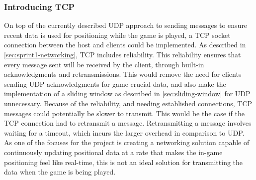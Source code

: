 \subsubsection{Introducing TCP}
On top of the currently described UDP approach to sending messages to ensure recent data is used for positioning while the game is played, a TCP socket connection between the host and clients could be implemented.
As described in \autoref{sec:sprint1-networking}, TCP includes reliability.
This reliability ensures that every message sent will be received by the client, through built-in acknowledgments and retransmissions.
This would remove the need for clients sending UDP acknowledgments for game crucial data, and also make the implementation of a sliding window as described in \autoref{sec:sliding-window} for UDP unnecessary.
Because of the reliability, and needing established connections, TCP messages could potentially be slower to transmit.
This would be the case if the TCP connection had to retransmit a message.
Retransmitting a message involves waiting for a timeout, which incurs the larger overhead in comparison to UDP.
As one of the focuses for the project is creating a networking solution capable of continuously updating positional data at a rate that makes the in-game positioning feel like real-time, this is not an ideal solution for transmitting the data when the game is being played.
